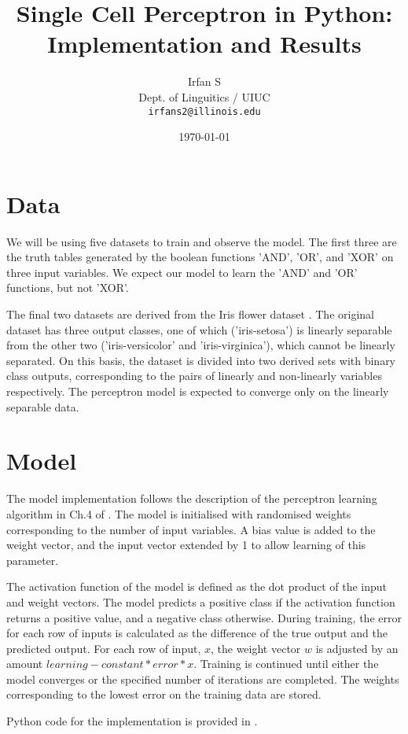 \documentclass[11pt,a4paper]{article}
\author{Irfan S \\ Dept. of Linguitics / UIUC \\ {\tt irfans2@illinois.edu}}
\date{\today}
\title{Single Cell Perceptron in Python: Implementation and Results}
\begin{document}
\maketitle

\section{Data}
\label{sec:org464ea1c}
We will be using five datasets to train and observe the model. The first three are the truth tables generated by the boolean functions 'AND', 'OR', and 'XOR' on three input variables. We expect our model to learn the 'AND' and 'OR' functions, but not 'XOR'.

The final two datasets are derived from the Iris flower dataset \citep{Lichman:2013} . The original dataset has three output classes, one of which ('iris-setosa') is linearly separable from the other two ('iris-versicolor' and 'iris-virginica'), which cannot be linearly separated. On this basis, the dataset is divided into two derived sets with binary class outputs, corresponding to the pairs of linearly and non-linearly variables respectively. The perceptron model is expected to converge only on the linearly separable data.


\section{Model}
\label{sec:orgfbec5d2}
The model implementation follows the description of the perceptron learning algorithm in Ch.4 of \citet{rojas-1996}. The model is initialised with randomised weights corresponding to the number of input variables. A bias value is added to the weight vector, and the input vector extended by 1 to allow learning of this parameter.

The activation function of the model is defined as the dot product of the input and weight vectors. The model predicts a positive class if the activation function returns a positive value, and a negative class otherwise. During training, the error for each row of inputs is calculated as the difference of the true output and the predicted output. For each row of input, \(x\), the weight vector \(w\) is adjusted by an amount \(learning-constant * error * x\). Training is continued until either the model converges or the specified number of iterations are completed. The weights corresponding to the lowest error on the training data are stored.

Python code for the implementation is provided in .
\end{document}
